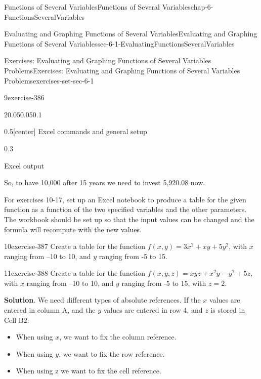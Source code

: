 \documentclass[oneside,10pt,]{book}
\numberwithin{equation}{section}
\begin{document}
\begin{chapterptx}{Functions of Several Variables}{}{Functions of Several Variables}{}{}{chap-6-FunctionsSeveralVariables}
\begin{sectionptx}{Evaluating and Graphing Functions of Several Variables}{}{Evaluating and Graphing Functions of Several Variables}{}{}{sec-6-1-EvaluatingFunctionsSeveralVariables}
\begin{exercises-subsection-numberless}{Exercises: Evaluating and Graphing Functions of Several Variables Problems}{}{Exercises: Evaluating and Graphing Functions of Several Variables Problems}{}{}{exercises-set-sec-6-1}
\begin{exercisegroup}
\begin{divisionexerciseeg}{9}{}{}{exercise-386}
\begin{sidebyside}{2}{0.05}{0.05}{0.1}
\begin{sbspanel}{0.5}[center]%
\hypertarget{p-2179}{}%
Excel commands  and general setup%
\end{sbspanel}%
\begin{sbspanel}{0.3}%
\par
\hypertarget{p-2180}{}%
Excel output%
\end{sbspanel}%
\end{sidebyside}%
\par
\hypertarget{p-2181}{}%
So, to have \textdollar{}10,000 after 15 years we need to invest \textdollar{}5,920.08 now.%
\end{divisionexerciseeg}%
\end{exercisegroup}
\par\medskip\noindent
\par\medskip\noindent%
\hypertarget{exercisegroup-25}{}%
\hypertarget{p-2182}{}%
For exercises 10-17, set up an Excel notebook to produce a table for the given function as a function of the two specified variables and the other parameters. The workbook should be set up so that the input values can be changed and the formula will recompute with the new values.%
\begin{exercisegroup}
\begin{divisionexerciseeg}{10}{}{}{exercise-387}%
\hypertarget{p-2183}{}%
Create a table for the function \(f(x,y)=3x^2+xy+5y^2\), with \(x\) ranging from –10 to 10, and \(y\) ranging from -5 to 15.%
\end{divisionexerciseeg}%
\begin{divisionexerciseeg}{11}{}{}{exercise-388}%
\hypertarget{p-2184}{}%
Create a table for the function \(f(x,y,z)=xyz+x^2 y-y^2+5z\), with \(x\) ranging from –10 to 10, and \(y\) ranging from -5 to 15, with \(z=2\).%
\par\smallskip%
\noindent\textbf{Solution}.\hypertarget{solution-195}{}\quad%
\hypertarget{p-2185}{}%
We need different types of absolute references. If the \(x\) values are entered in column A, and the \(y\) values are entered in row 4, and \(z\) is stored in Cell B2:%
\leavevmode%
\begin{itemize}[label=\textbullet]
\item{}\hypertarget{p-2186}{}%
When using \(x\), we want to fix the column reference.%
\item{}\hypertarget{p-2187}{}%
When using \(y\), we want to fix the row reference.%
\item{}\hypertarget{p-2188}{}%
When using z we want to fix the cell reference.%

\end{itemize}
\end{divisionexerciseeg}
\end{exercisegroup}
\end{exercises-subsection-numberless}
\end{sectionptx}
\end{chapterptx}
\end{document}
